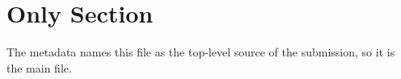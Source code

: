 \documentclass{article}
\begin{document}
\section{Only Section}
The metadata names this file as the top-level source of the submission, so it is the main file.
\end{document}
